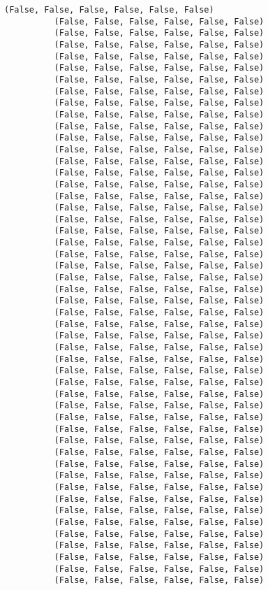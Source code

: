 \documentclass{article}
\begin{document}
\begin{Verbatim}[commandchars=\\\{\}]
          (False, False, False, False, False, False)
          (False, False, False, False, False, False)
          (False, False, False, False, False, False)
          (False, False, False, False, False, False)
          (False, False, False, False, False, False)
          (False, False, False, False, False, False)
          (False, False, False, False, False, False)
          (False, False, False, False, False, False)
          (False, False, False, False, False, False)
          (False, False, False, False, False, False)
          (False, False, False, False, False, False)
          (False, False, False, False, False, False)
          (False, False, False, False, False, False)
          (False, False, False, False, False, False)
          (False, False, False, False, False, False)
          (False, False, False, False, False, False)
          (False, False, False, False, False, False)
          (False, False, False, False, False, False)
          (False, False, False, False, False, False)
          (False, False, False, False, False, False)
          (False, False, False, False, False, False)
          (False, False, False, False, False, False)
          (False, False, False, False, False, False)
          (False, False, False, False, False, False)
          (False, False, False, False, False, False)
          (False, False, False, False, False, False)
          (False, False, False, False, False, False)
          (False, False, False, False, False, False)
          (False, False, False, False, False, False)
          (False, False, False, False, False, False)
          (False, False, False, False, False, False)
          (False, False, False, False, False, False)
          (False, False, False, False, False, False)
          (False, False, False, False, False, False)
          (False, False, False, False, False, False)
          (False, False, False, False, False, False)
          (False, False, False, False, False, False)
          (False, False, False, False, False, False)
          (False, False, False, False, False, False)
          (False, False, False, False, False, False)
          (False, False, False, False, False, False)
          (False, False, False, False, False, False)
          (False, False, False, False, False, False)
          (False, False, False, False, False, False)
          (False, False, False, False, False, False)
          (False, False, False, False, False, False)
          (False, False, False, False, False, False)
          (False, False, False, False, False, False)
          (False, False, False, False, False, False)
          (False, False, False, False, False, False)

\end{Verbatim}
\end{document}
